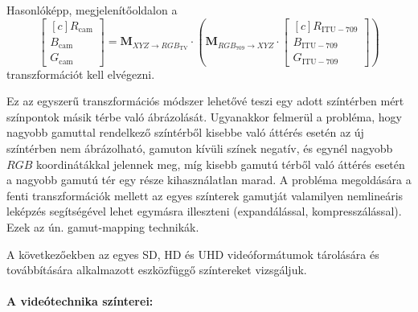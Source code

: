 %
Hasonlóképp, megjelenítőoldalon a
\begin{equation} 
\begin{bmatrix}[c]
       R_{\mathrm{cam}} \\[0.3em]
       B_{\mathrm{cam}} \\[0.3em]
       G_{\mathrm{cam}} \end{bmatrix}
       =
       \mathbf{M}_{ X\!Y\!Z \rightarrow R\!G\!B_{\mathrm{TV}} } \cdot 
\left(     \mathbf{M}_{R\!G\!B_{709}  \rightarrow X\!Y\!Z } \cdot
\begin{bmatrix}[c]
       R_{\mathrm{ITU}-709} \\[0.3em]
       B_{\mathrm{ITU}-709} \\[0.3em]
       G_{\mathrm{ITU}-709} \end{bmatrix}
 \right)
\end{equation}
transzformációt kell elvégezni.

Ez az egyszerű transzformációs módszer lehetővé teszi egy adott színtérben mért színpontok másik térbe való ábrázolását.
Ugyanakkor felmerül a probléma, hogy nagyobb gamuttal rendelkező színtérből kisebbe való áttérés esetén az új színtérben nem ábrázolható, gamuton kívüli színek negatív, és egynél nagyobb $RGB$ koordinátákkal jelennek meg, míg kisebb gamutú térből való áttérés esetén a nagyobb gamutú tér egy része kihasználatlan marad.
A probléma megoldására a fenti transzformációk mellett az egyes színterek gamutját valamilyen nemlineáris leképzés segítségével lehet egymásra illeszteni (expandálással, kompresszálással).
Ezek az ún. gamut-mapping technikák.

A következőekben az egyes SD, HD és UHD videóformátumok tárolására és továbbítására alkalmazott eszközfüggő színtereket vizsgáljuk.

\paragraph{A videótechnika színterei:\\}

